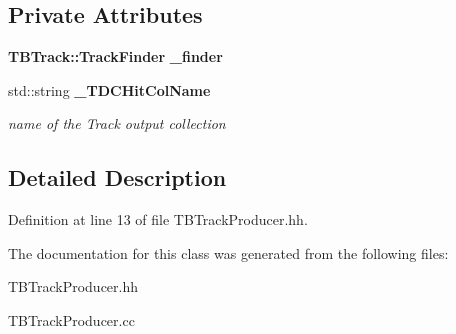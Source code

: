 \subsection*{Private Attributes}
\begin{DoxyCompactItemize}
\item 
{\bf TBTrack::TrackFinder} {\bfseries \_\-finder}\label{classTBTrackProducer_af6ef70618261f9e609a35018aba95110}

\item 
std::string {\bf \_\-TDCHitColName}\label{classTBTrackProducer_aaa9b990c825fb14a9b0a16254dc65cea}

\begin{DoxyCompactList}\small\item\em name of the Track output collection \item\end{DoxyCompactList}\end{DoxyCompactItemize}


\subsection{Detailed Description}


Definition at line 13 of file TBTrackProducer.hh.

The documentation for this class was generated from the following files:\begin{DoxyCompactItemize}
\item 
TBTrackProducer.hh\item 
TBTrackProducer.cc\end{DoxyCompactItemize}
